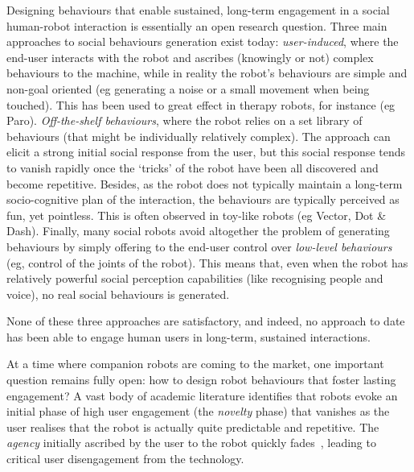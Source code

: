 \documentclass[11pt,a4paper]{report}
\newcommand{\project}{WizUs\xspace}
\begin{document}
%

Designing behaviours that
enable sustained, long-term engagement in a social human-robot interaction is
essentially an open research question. Three main approaches to social
behaviours generation exist today: \emph{user-induced}, where the end-user
interacts with the robot and ascribes (knowingly or not) complex behaviours to
the machine, while in reality the robot's behaviours are simple and non-goal
oriented (eg generating a noise or a small movement when being touched). This
has been used to great effect in therapy robots, for instance (eg Paro).
\emph{Off-the-shelf behaviours}, where the robot relies on a set library of
behaviours (that might be individually relatively complex). The approach can
elicit a strong initial social response from the user, but this social response
tends to vanish rapidly once the `tricks' of the robot have been all discovered
and become repetitive.  Besides, as the robot does not typically maintain a
long-term socio-cognitive plan of the interaction, the behaviours are typically
perceived as fun, yet pointless. This is often observed in toy-like robots (eg
Vector, Dot \& Dash). Finally, many social robots avoid altogether the problem
of generating behaviours by simply offering to the end-user control over
\emph{low-level behaviours} (eg, control of the joints of the robot). This means
that, even when the robot has relatively powerful social perception capabilities
(like recognising people and voice), no real social behaviours is generated.

None of these three approaches are satisfactory, and indeed, no approach to date
has been able to engage human users in long-term, sustained interactions.




At a time where companion robots are coming to the market, one important
question remains fully open: how to design robot behaviours that foster
lasting engagement? A vast body of academic literature identifies that
robots evoke an initial phase of high user engagement (the
\emph{novelty} phase) that vanishes as the user realises that the robot
is actually quite predictable and repetitive. The \emph{agency}
initially ascribed by the user to the robot quickly
fades~\cite{lemaignan2014dynamics}, leading to critical user disengagement from the technology.
\end{document}
